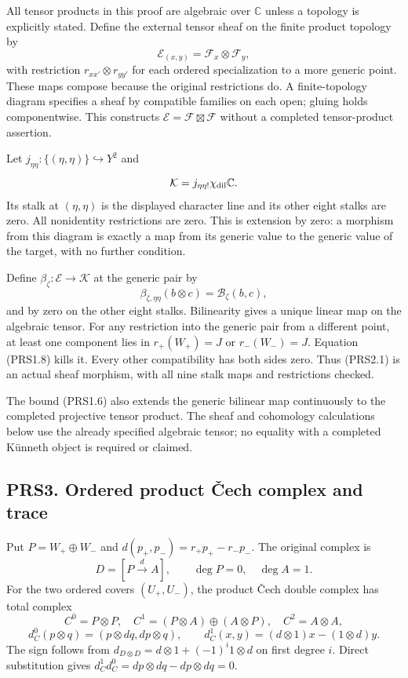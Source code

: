 All tensor products in this proof are algebraic over \(\mathbb C\)
unless a topology is explicitly stated. Define the external tensor sheaf
on the finite product topology by \[
\mathcal E_{(x,y)}=\mathcal F_x\otimes\mathcal F_y,
\] with restriction \(r_{xx'}\otimes r_{yy'}\) for each ordered
specialization to a more generic point. These maps compose because the
original restrictions do. A finite-topology diagram specifies a sheaf by
compatible families on each open; gluing holds componentwise. This
constructs \(\mathcal E=\mathcal F\boxtimes\mathcal F\) without a
completed tensor-product assertion.

Let \(j_{\eta\eta}:\{(\eta,\eta)\}\hookrightarrow Y^2\) and \[
\mathcal K=j_{\eta\eta!}\chi_{\rm dil}\mathbb C.
\] Its stalk at \((\eta,\eta)\) is the displayed character line and its
other eight stalks are zero. All nonidentity restrictions are zero. This
is extension by zero: a morphism from this diagram is exactly a map from
its generic value to the generic value of the target, with no further
condition.

Define \(\beta_\zeta:\mathcal E\to\mathcal K\) at the generic pair by \[
\beta_{\zeta,\eta\eta}(b\otimes c)=\mathcal B_\zeta(b,c),
\tag{PRS2.1}
\] and by zero on the other eight stalks. Bilinearity gives a unique
linear map on the algebraic tensor. For any restriction into the generic
pair from a different point, at least one component lies in
\(r_+(W_+)=J\) or \(r_-(W_-)=J\). Equation (PRS1.8) kills it. Every
other compatibility has both sides zero. Thus (PRS2.1) is an actual
sheaf morphism, with all nine stalk maps and restrictions checked.

The bound (PRS1.6) also extends the generic bilinear map continuously to
the completed projective tensor product. The sheaf and cohomology
calculations below use the already specified algebraic tensor; no
equality with a completed Künneth object is required or claimed.

\subsection{PRS3. Ordered product Čech complex and
trace}\label{prs3.-ordered-product-ux10dech-complex-and-trace}

Put \(P=W_+\oplus W_-\) and \(d(p_+,p_-)=r_+p_+-r_-p_-\). The original
complex is \[
D=[P\xrightarrow{d}A],\qquad \deg P=0,\quad\deg A=1.
\] For the two ordered covers \((U_+,U_-)\), the product Čech double
complex has total complex \[
C^0=P\otimes P,\quad
C^1=(P\otimes A)\oplus(A\otimes P),\quad
C^2=A\otimes A,
\] \[
d_C^0(p\otimes q)=(p\otimes dq,dp\otimes q),\qquad
d_C^1(x,y)=(d\otimes1)x-(1\otimes d)y.
\tag{PRS3.1}
\] The sign follows from \(d_{D\otimes D}=d\otimes1+(-1)^i1\otimes d\)
on first degree \(i\). Direct substitution gives
\(d_C^1d_C^0=dp\otimes dq-dp\otimes dq=0\).

